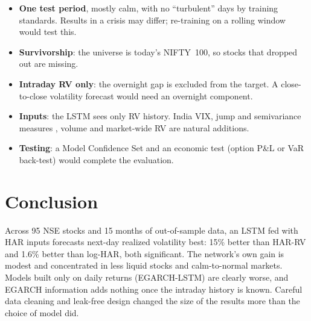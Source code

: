 \documentclass[11pt,a4paper]{article}
\let\oldsection\section
\renewcommand{\section}{\FloatBarrier\needspace{6\baselineskip}\oldsection}
\begin{document}
\begin{itemize}
\item \textbf{One test period}, mostly calm, with no ``turbulent'' days by training standards. Results in a
crisis may differ; re-training on a rolling window would test this.
\item \textbf{Survivorship}: the universe is today's NIFTY~100, so stocks that dropped out are missing.
\item \textbf{Intraday RV only}: the overnight gap is excluded from the target. A close-to-close
volatility forecast would need an overnight component.
\item \textbf{Inputs}: the LSTM sees only RV history. India VIX, jump and semivariance measures
\citep{bollerslev2016}, volume and market-wide RV are natural additions.
\item \textbf{Testing}: a Model Confidence Set \citep{hansen2011} and an economic test (option P\&L or VaR
back-test) would complete the evaluation.
\end{itemize}

\section{Conclusion}

Across 95 NSE stocks and 15 months of out-of-sample data, an LSTM fed with HAR inputs forecasts next-day
realized volatility best: 15\% better than HAR-RV and 1.6\% better than log-HAR, both significant. The
network's own gain is modest and concentrated in less liquid stocks and calm-to-normal markets. Models
built only on daily returns (EGARCH-LSTM) are clearly worse, and EGARCH information adds nothing once the
intraday history is known. Careful data cleaning and leak-free design changed the size of the results
more than the choice of model did.
\end{document}
